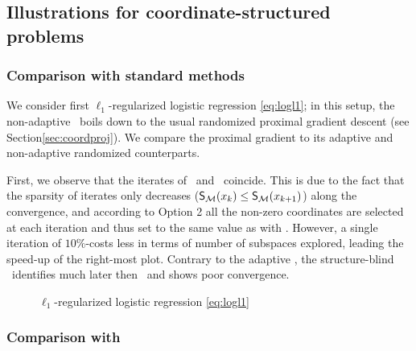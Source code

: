 \subsection{Illustrations for coordinate-structured problems}


\subsubsection{Comparison with standard methods}

{We consider first $\ell_1$-regularized logistic regression \eqref{eq:logl1}; in this setup, the non-adaptive \algo~boils down to the usual randomized proximal gradient descent (see Section\;\ref{sec:coordproj}). We compare the proximal gradient to its adaptive and non-adaptive randomized counterparts.

First, we observe that the iterates of \pgd~and \adaalgo~coincide. This is due to the fact that the sparsity of iterates only decreases ($\S(x_k)\leq \S(x_{k+1})$) along the convergence, and according to Option 2 all the non-zero coordinates are selected at each iteration and thus set to the same value as with \pgd. However, a single iteration of $10\%$-\adaalgo costs less in terms of number of subspaces explored, leading the speed-up of the right-most plot.  Contrary to the adaptive \adaalgo, the structure-blind \algo~identifies much later then \pgd~and shows poor convergence.}


\begin{figure}[H]
\begin{center}
\scalebox{.85}{}
\scalebox{.85}{}
\scalebox{.85}{}
\end{center}
\caption{$\ell_1$-regularized logistic regression \eqref{eq:logl1}
}
\label{fig:rcv1}
\end{figure}

\subsubsection{Comparison with \sega}\label{sec:num:sega}


